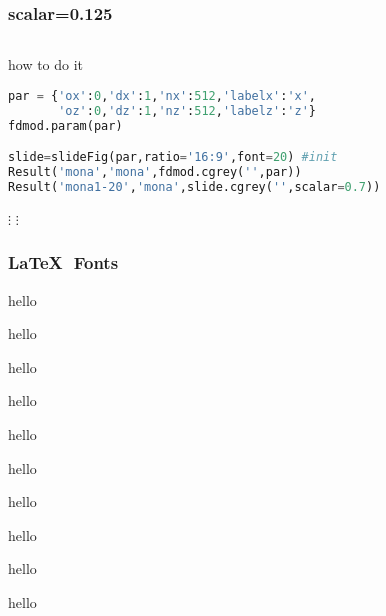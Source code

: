 \begin{frame}\frametitle{scalar=0.125}
  \begin{columns}
      \vspace{-0.5in}
      \vspace{-0.5in}
      \vspace{-0.5in}
      \vspace{-0.5in}
      \vspace{-0.5in}
      \vspace{-0.5in}
      \vspace{-0.5in}
      \vspace{-0.5in}
  \end{columns}
\end{frame}


\usebackgroundtemplate{}
\begin{frame}
\end{frame}
\begin{frame}[fragile]{how to do it}
\begin{lstlisting}[language=python]
par = {'ox':0,'dx':1,'nx':512,'labelx':'x',
       'oz':0,'dz':1,'nz':512,'labelz':'z'}
fdmod.param(par)

slide=slideFig(par,ratio='16:9',font=20) #init
Result('mona','mona',fdmod.cgrey('',par))
Result('mona1-20','mona',slide.cgrey('',scalar=0.7))

\end{lstlisting}
\centering
$\vdots$
$\vdots$

\end{frame}


\usebackgroundtemplate{}
\begin{frame}\frametitle{\LaTeX$\text{ }$Fonts}
\centering
\tiny hello

\scriptsize hello

\footnotesize hello

\small hello

\normalsize hello

\large hello

\Large hello

\LARGE hello

\huge hello

\centering
\Huge hello

\end{frame}





